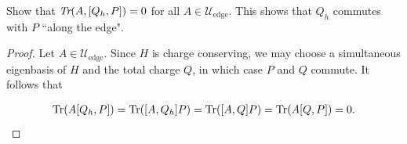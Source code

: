 \documentclass[12pt, letterpaper]{article}
\begin{document}
\begin{lemma}
Show that $\emph{Tr}(A,[Q_h,P])=0$ for all $A \in \mathcal{U}_{\text{edge}}$. This shows that $Q_h$ commutes with $P$ ``along the edge".
\label{lemma:[Q,P]=0}
\end{lemma}
\begin{proof}

Let $A \in \mathcal{U}_{\text{edge}}$. Since $H$ is charge conserving, we may choose a simultaneous eigenbasis of $H$ and the total charge $Q$, in which case $P$ and $Q$ commute. It follows that

\[\begin{aligned}
\text{Tr}(A[Q_h, P]) = \text{Tr}([A, Q_h] P) = \text{Tr}([A, Q]P) = \text{Tr}(A[Q,P]) = 0.
\end{aligned}\]







\end{proof}
\end{document}
